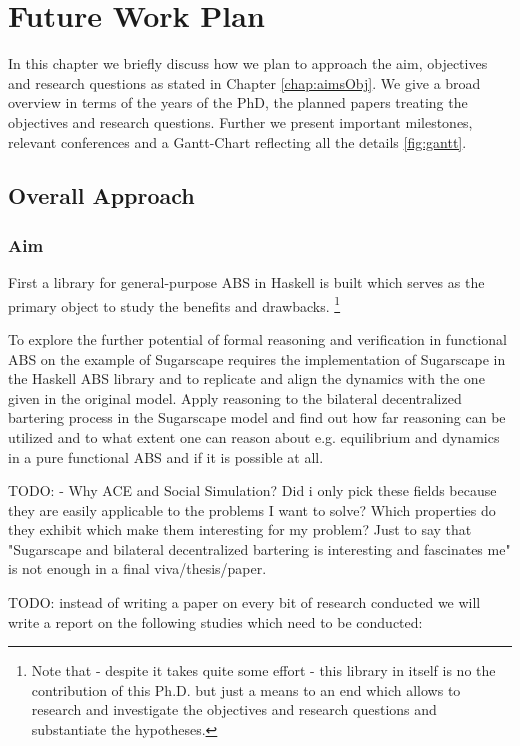 \chapter{Future Work Plan}
\label{chap:future}

In this chapter we briefly discuss how we plan to approach the aim, objectives and research questions as stated in Chapter \ref{chap:aimsObj}. We give a broad overview in terms of the years of the PhD, the planned papers treating the objectives and research questions. Further we present important milestones, relevant conferences and a Gantt-Chart reflecting all the details \ref{fig:gantt}.

\section{Overall Approach}

\subsection{Aim}
First a library for general-purpose ABS in Haskell is built which serves as the primary object to study the benefits and drawbacks. \footnote{Note that - despite it takes quite some effort - this library in itself is no the contribution of this Ph.D. but just a means to an end which allows to research and investigate the objectives and research questions and substantiate the hypotheses.}

To explore the further potential of formal reasoning and verification in functional ABS on the example of Sugarscape requires the implementation of Sugarscape in the Haskell ABS library and to replicate and align the dynamics with the one given in the original model. Apply reasoning to the bilateral decentralized bartering process in the Sugarscape model and find out how far reasoning can be utilized and to what extent one can reason about e.g. equilibrium and dynamics in a pure functional ABS and if it is possible at all.

TODO:
- Why ACE and Social Simulation? Did i only pick these fields because they are easily applicable to the problems I want to solve? Which properties do they exhibit which make them interesting for my problem? Just to say that "Sugarscape and bilateral decentralized bartering is interesting and fascinates me" is not enough in a final viva/thesis/paper.	

TODO:
instead of writing a paper on every bit of research conducted we will write a report on the following studies which need to be conducted:

